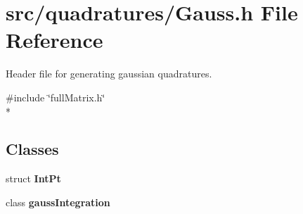 \section{src/quadratures/\-Gauss.h File Reference}
\label{Gauss_8h}


Header file for generating gaussian quadratures.  


{\ttfamily \#include \char`\"{}full\-Matrix.\-h\char`\"{}}\\*
\subsection*{Classes}
\begin{DoxyCompactItemize}
\item 
struct {\bf Int\-Pt}
\item 
class {\bf gauss\-Integration}
\end{DoxyCompactItemize}
